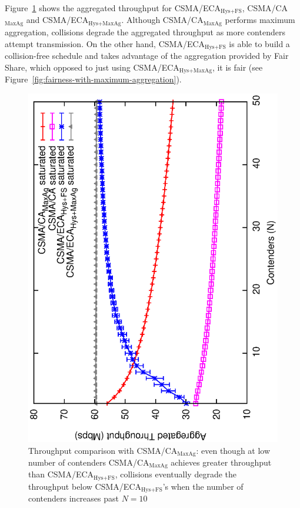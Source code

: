 \documentclass[a4paper,journal]{IEEEtran}
\begin{document}
	Figure~\ref{fig:ECA-vs-DCF-maxAgg} shows the aggregated throughput for CSMA/ECA$_{\text{Hys+FS}}$, CSMA/CA$_{\text{MaxAg}}$ and CSMA/ECA$_{\text{Hys+MaxAg}}$. Although CSMA/CA$_{\text{MaxAg}}$ performs maximum aggregation, collisions degrade the aggregated throughput as more contenders attempt transmission. On the other hand, CSMA/ECA$_{\text{Hys+FS}}$ is able to build a collision-free schedule and takes advantage of the aggregation provided by Fair Share, which opposed to just using CSMA/ECA$_{\text{Hys+MaxAg}}$, it is fair (see Figure~\ref{fig:fairness-with-maximum-aggregation}).
	
	\begin{figure}[tb]
	\centering
		\includegraphics[width=0.7\linewidth,angle=-90]{figures/throughput-max-Ag/throughput-saturated-maxAgg.eps}
		\caption{Throughput comparison with CSMA/CA$_{\text{MaxAg}}$: even though at low number of contenders CSMA/CA$_{\text{MaxAg}}$ achieves greater throughput than CSMA/ECA$_{\text{Hys+FS}}$, collisions eventually degrade the throughput below CSMA/ECA$_{\text{Hys+FS}}$'s when the number of contenders increases past $N=10$}
		\label{fig:ECA-vs-DCF-maxAgg}
	\end{figure}
	
\end{document}
